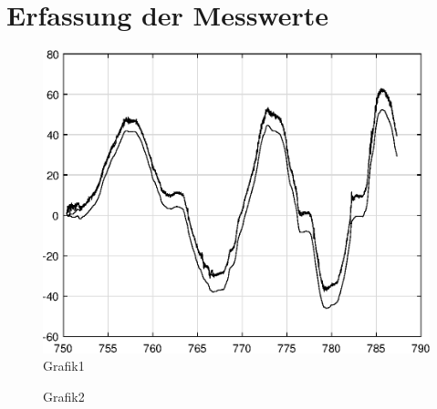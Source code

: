 \chapter{Erfassung der Messwerte}
\label{sec: Erfassung der Messwerte}

\begin{figure}[h]
	\centering
	\includegraphics[width=1\textwidth]{Matlab/KalmanXRotation.eps}
	\caption{Grafik1}
	\label{fig: Grafik1}
\end{figure}


\begin{figure}[h]
	\centering
	
	\caption{Grafik2}
	\label{fig: Grafik2}
\end{figure}